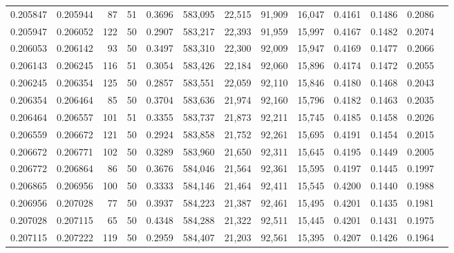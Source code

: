 \begin{tabular}{rrrrrrrrrrrrr}
0.205847 & 0.205944 &    87 &  51 &                                     0.3696 & 583,095 &  22,515 &  91,909 &  16,047 & 0.4161 & 0.1486 & 0.2086 \\
0.205947 & 0.206052 &   122 &  50 &                                     0.2907 & 583,217 &  22,393 &  91,959 &  15,997 & 0.4167 & 0.1482 & 0.2074 \\
0.206053 & 0.206142 &    93 &  50 &                                     0.3497 & 583,310 &  22,300 &  92,009 &  15,947 & 0.4169 & 0.1477 & 0.2066 \\
0.206143 & 0.206245 &   116 &  51 &                                     0.3054 & 583,426 &  22,184 &  92,060 &  15,896 & 0.4174 & 0.1472 & 0.2055 \\
0.206245 & 0.206354 &   125 &  50 &                                     0.2857 & 583,551 &  22,059 &  92,110 &  15,846 & 0.4180 & 0.1468 & 0.2043 \\
0.206354 & 0.206464 &    85 &  50 &                                     0.3704 & 583,636 &  21,974 &  92,160 &  15,796 & 0.4182 & 0.1463 & 0.2035 \\
0.206464 & 0.206557 &   101 &  51 &                                     0.3355 & 583,737 &  21,873 &  92,211 &  15,745 & 0.4185 & 0.1458 & 0.2026 \\
0.206559 & 0.206672 &   121 &  50 &                                     0.2924 & 583,858 &  21,752 &  92,261 &  15,695 & 0.4191 & 0.1454 & 0.2015 \\
0.206672 & 0.206771 &   102 &  50 &                                     0.3289 & 583,960 &  21,650 &  92,311 &  15,645 & 0.4195 & 0.1449 & 0.2005 \\
0.206772 & 0.206864 &    86 &  50 &                                     0.3676 & 584,046 &  21,564 &  92,361 &  15,595 & 0.4197 & 0.1445 & 0.1997 \\
0.206865 & 0.206956 &   100 &  50 &                                     0.3333 & 584,146 &  21,464 &  92,411 &  15,545 & 0.4200 & 0.1440 & 0.1988 \\
0.206956 & 0.207028 &    77 &  50 &                                     0.3937 & 584,223 &  21,387 &  92,461 &  15,495 & 0.4201 & 0.1435 & 0.1981 \\
0.207028 & 0.207115 &    65 &  50 &                                     0.4348 & 584,288 &  21,322 &  92,511 &  15,445 & 0.4201 & 0.1431 & 0.1975 \\
0.207115 & 0.207222 &   119 &  50 &                                     0.2959 & 584,407 &  21,203 &  92,561 &  15,395 & 0.4207 & 0.1426 & 0.1964 \\

\end{tabular}
